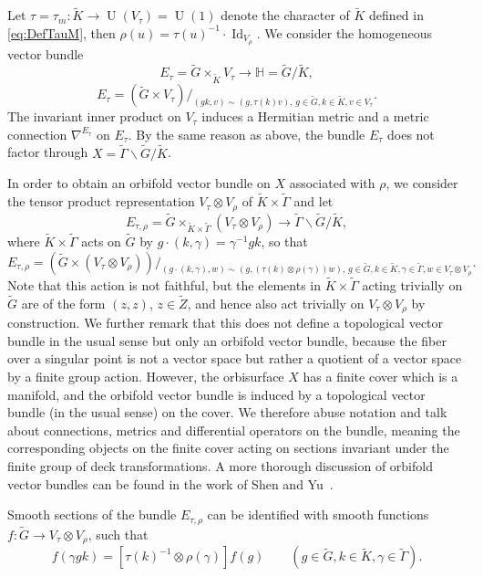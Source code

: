 \documentclass[10pt]{amsart}
\theoremstyle{plain}
\theoremstyle{definition}
\theoremstyle{remark}
\renewcommand{\H}{\mathbb{H}}
\DeclareMathOperator{\Id}{Id}
\numberwithin{equation}{section}
\begin{document}
Let $\tau=\tau_m:\widetilde{K}\to\operatorname{U}(V_\tau)=\operatorname{U}(1)$ denote the character of $\widetilde{K}$ defined in \cref{eq:DefTauM}, then $\rho(u)=\tau(u)^{-1}\cdot\Id_{V_\rho}$. We consider the homogeneous vector bundle
\[
E_\tau=\widetilde{G}\times_{\widetilde{K}}V_\tau\to \H=\widetilde{G}/\widetilde{K},
\]
\ie
\[
E_\tau = (\widetilde{G}\times V_\tau)/_{(gk,v)\sim(g,\tau(k)v),\,g\in\widetilde{G},k\in\widetilde{K},v\in V_\tau}.
\]
The invariant inner product on $V_\tau$ induces a Hermitian metric and a metric connection $\nabla^{E_\tau}$ on $E_\tau$. By the same reason as above, the bundle $E_\tau$ does not factor through $X=\widetilde{\Gamma}\backslash\widetilde{G}/\widetilde{K}$.

In order to obtain an orbifold vector bundle on $X$ associated with $\rho$, we consider the tensor product representation $V_\tau\otimes V_\rho$ of $\widetilde{K}\times\widetilde{\Gamma}$ and let
\[
E_{\tau,\rho} = \widetilde{G}\times_{\widetilde{K}\times\widetilde{\Gamma}}(V_\tau\otimes V_\rho) \to \widetilde{\Gamma}\backslash\widetilde{G}/\widetilde{K},
\]
where $\widetilde{K}\times\widetilde{\Gamma}$ acts on $\widetilde{G}$ by $g\cdot(k,\gamma)= \gamma^{-1}gk$, so that
\[
E_{\tau,\rho} = (\widetilde{G}\times(V_\tau\otimes V_\rho))/_{(g\cdot(k,\gamma),w)\sim(g,(\tau(k)\otimes\rho(\gamma))w),\,g\in\widetilde{G},k\in\widetilde{K},\gamma\in\widetilde{\Gamma},w\in V_\tau\otimes V_\rho}.
\]
Note that this action is not faithful, but the elements in $\widetilde{K}\times\widetilde{\Gamma}$ acting trivially on $\widetilde{G}$ are of the form $(z,z)$, $z\in\widetilde{Z}$, and hence also act trivially on $V_\tau\otimes V_\rho$ by construction. We further remark that this does not define a topological vector bundle in the usual sense but only an orbifold vector bundle, because the fiber over a singular point is not a vector space but rather a quotient of a vector space by a finite group action. However, the orbisurface $X$ has a finite cover which is a manifold, and the orbifold vector bundle is induced by a topological vector bundle (in the usual sense) on the cover. We therefore abuse notation and talk about connections, metrics and differential operators on the bundle, meaning the corresponding objects on the finite cover acting on sections invariant under the finite group of deck transformations. A more thorough discussion of orbifold vector bundles can be found in the work of Shen and Yu~\cite{SY22}.

Smooth sections of the bundle $E_{\tau,\rho}$ can be identified with smooth functions $f:\widetilde{G}\to V_\tau\otimes V_\rho$, such that
\[
f(\gamma gk) = \left[\tau(k)^{-1}\otimes\rho(\gamma)\right]f(g) \qquad (g\in\widetilde{G},k\in\widetilde{K},\gamma\in\widetilde{\Gamma}).
\]
\end{document}

